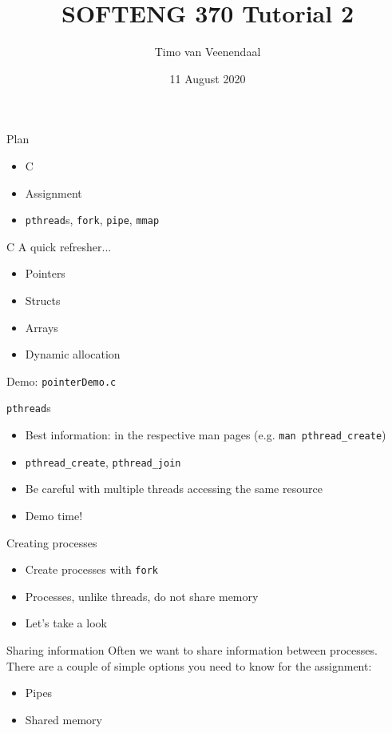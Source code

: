 \documentclass[notes]{beamer}
\title{SOFTENG 370 Tutorial 2}
\author{Timo van Veenendaal}
\date{11 August 2020}
\begin{document}
\maketitle

\begin{frame}{Plan}
    \begin{itemize}
	\item C
	\item Assignment
	\item \texttt{pthread}s, \texttt{fork}, \texttt{pipe}, \texttt{mmap}
    \end{itemize}
\end{frame}

\begin{frame}{C}
    A quick refresher...
    \begin{itemize}
	\item Pointers
	\item Structs
	\item Arrays
	\item Dynamic allocation
    \end{itemize}
    Demo: \texttt{pointerDemo.c}
\end{frame}

\begin{frame}{\texttt{pthread}s}
    \begin{itemize}
	\item Best information: in the respective man pages (e.g. \texttt{man pthread\_create})
	\item \texttt{pthread\_create}, \texttt{pthread\_join}
	\item Be careful with multiple threads accessing the same resource
	\item Demo time!
    \end{itemize}
\end{frame}

\begin{frame}{Creating processes}
    \begin{itemize}
	\pause
	\item Create processes with \texttt{fork}
	\item Processes, unlike threads, do not share memory
	\item Let's take a look
    \end{itemize}
\end{frame}

\begin{frame}{Sharing information}
    Often we want to share information between processes. There are a couple of simple options you need to know for the assignment:
    \begin{itemize}
	\item Pipes
	\item Shared memory
    \end{itemize}
\end{frame}
\end{document}
